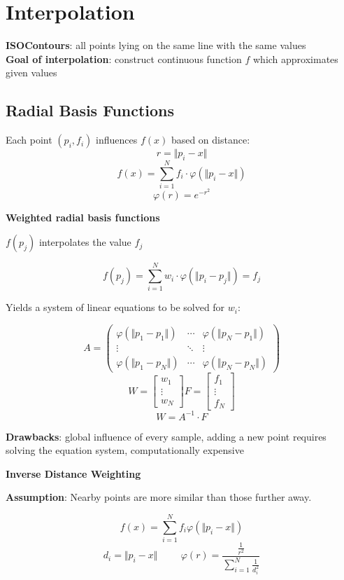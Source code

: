 \section{Interpolation}

\textbf{ISOContours}: all points lying on the same line with the same values \\
\textbf{Goal of interpolation}: construct continuous function $f$ which approximates given values

\subsection{Radial Basis Functions}
Each point $(p_i, f_i)$ influences $f(x)$ based on distance: \\
$$r = \Vert p_i - x \Vert$$
$$f(x) = \sum_{i = 1}^{N} f_i \cdot \varphi(\Vert p_i - x \Vert)$$
$$\varphi(r) = e^{-r^2}$$

\textbf{Weighted radial basis functions}

$f(p_j)$ interpolates the value $f_j$

$$f(p_j) = \sum_{i = 1}^N w_i \cdot \varphi (\Vert p_i - p_j \Vert) = f_j$$

Yields a system of linear equations to be solved for $w_i$:

$$
A = \begin{pmatrix}
    \varphi(\Vert p_1 - p_1 \Vert) & \cdots & \varphi(\Vert p_N - p_1 \Vert) \\
    \vdots  & \ddots & \vdots \\
    \varphi(\Vert p_1 - p_N \Vert) & \cdots & \varphi(\Vert p_N - p_N \Vert)
\end{pmatrix}
$$
$$
W = \begin{bmatrix}
    w_1 \\ \vdots \\ w_N
\end{bmatrix}
F = \begin{bmatrix}
    f_1 \\ \vdots \\ f_N
\end{bmatrix}
$$
$$W = A^{-1} \cdot F$$

\textbf{Drawbacks}: global influence of every sample, adding a new point requires solving the equation system, computationally expensive

\textbf{Inverse Distance Weighting}

\textbf{Assumption}: Nearby points are more similar than those further away.

$$f(x) = \sum_{i = 1}^N f_i \varphi(\Vert p_i - x \Vert)$$
$$d_i = \Vert p_i - x \Vert \hspace{1cm}
\varphi(r) = \frac{\frac{1}{r^2}}{\sum_{i = 1}^N \frac{1}{d_i^2}}$$

